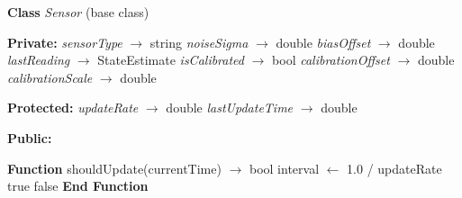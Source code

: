 \documentclass[a4paper,11pt]{article}
\begin{document}
\begin{algorithm}[H]
\caption{Sensor::generateReading   Generate a Noisy Sensor Reading}
\begin{algorithmic}[1]

\State \textbf{Class} \textit{Sensor} (base class)

\State \hspace{0.5cm} \textbf{Private:}
\State \hspace{1cm} \textit{sensorType} $\rightarrow$ string
\State \hspace{1cm} \textit{noiseSigma} $\rightarrow$ double
\State \hspace{1cm} \textit{biasOffset} $\rightarrow$ double
\State \hspace{1cm} \textit{lastReading} $\rightarrow$ StateEstimate
\State \hspace{1cm} \textit{isCalibrated} $\rightarrow$ bool
\State \hspace{1cm} \textit{calibrationOffset} $\rightarrow$ double
\State \hspace{1cm} \textit{calibrationScale} $\rightarrow$ double

\State \hspace{0.5cm} \textbf{Protected:}
\State \hspace{1cm} \textit{updateRate} $\rightarrow$ double
\State \hspace{1cm} \textit{lastUpdateTime} $\rightarrow$ double

\State \hspace{0.5cm} \textbf{Public:}

\vspace{0.2cm}
\State \hspace{1cm} \textbf{Function} shouldUpdate(currentTime) $\rightarrow$ bool
\State \hspace{1.5cm} interval $\leftarrow$ 1.0 / updateRate
\State \hspace{1.5cm} 
\State \hspace{2cm} \Return true
\State \hspace{1.5cm} \Else
\State \hspace{2cm} \Return false
\State \hspace{1.5cm} \EndIf
\State \hspace{1cm} \textbf{End Function}


\end{algorithmic}
\end{algorithm}
\end{document}
